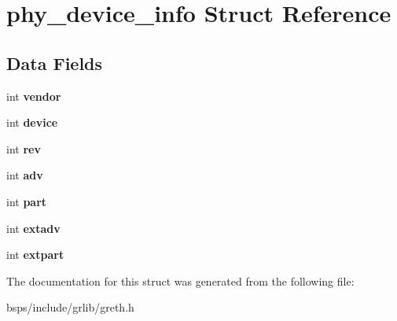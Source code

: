 \hypertarget{structphy__device__info}{}\section{phy\+\_\+device\+\_\+info Struct Reference}
\label{structphy__device__info}
\subsection*{Data Fields}
\begin{DoxyCompactItemize}
\item 
\mbox{\label{structphy__device__info_a50b2eca151b4cfb0f3c1c4c025525fb7}} 
int {\bfseries vendor}
\item 
\mbox{\label{structphy__device__info_aad9f52f872b08585851829fd13c736cc}} 
int {\bfseries device}
\item 
\mbox{\label{structphy__device__info_abe27e50cf5436255056a4ae6a7c7a2d8}} 
int {\bfseries rev}
\item 
\mbox{\label{structphy__device__info_ad76c48c1ff583bc48b67476f60af7290}} 
int {\bfseries adv}
\item 
\mbox{\label{structphy__device__info_afd7cf003463c939880d7c9ba6bbad146}} 
int {\bfseries part}
\item 
\mbox{\label{structphy__device__info_a628ba3301dd67d0c79fe34b7eabc93c2}} 
int {\bfseries extadv}
\item 
\mbox{\label{structphy__device__info_a54a0ae58250b478607c329338f24cc03}} 
int {\bfseries extpart}
\end{DoxyCompactItemize}


The documentation for this struct was generated from the following file\+:\begin{DoxyCompactItemize}
\item 
bsps/include/grlib/greth.\+h\end{DoxyCompactItemize}
